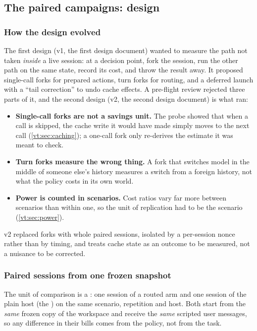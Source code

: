 \subsection{The paired campaigns: design}\label{vt:sec:design}

\subsubsection{How the design evolved}\label{vt:sec:evolution}

The first design (v1, the first design document) wanted to measure the path not taken
\emph{inside} a live session: at a decision point, fork the session, run the other path on the same state, record
its cost, and throw the result away. It proposed single-call forks for prepared actions, turn forks for routing,
and a deferred launch with a ``tail correction'' to undo cache effects. A pre-flight review rejected three parts
of it, and the second design (v2, the second design document) is what ran:
\begin{itemize}
  \item \textbf{Single-call forks are not a savings unit.} The probe showed that when a call is skipped, the cache
    write it would have made simply moves to the next call (\cref{vt:sec:caching}); a one-call fork only re-derives
    the estimate it was meant to check.
  \item \textbf{Turn forks measure the wrong thing.} A fork that switches model in the middle of someone else's
    history measures a switch from a foreign history, not what the policy costs in its own world.
  \item \textbf{Power is counted in scenarios.} Cost ratios vary far more between scenarios than within one, so
    the unit of replication had to be the scenario (\cref{vt:sec:power}).
\end{itemize}
v2 replaced forks with whole paired sessions, isolated by a per-session nonce rather than by timing, and treats
cache state as an outcome to be measured, not a nuisance to be corrected.

\subsubsection{Paired sessions from one frozen snapshot}

The unit of comparison is a : one session of a routed arm and one session of the plain host
(the ) on the same scenario, repetition and host. Both start from the \emph{same} frozen copy
of the workspace and receive the \emph{same} scripted user messages, so any difference in their bills
comes from the policy, not from the task.


